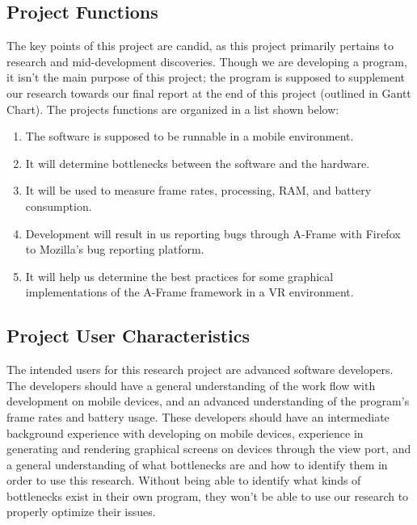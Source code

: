 \documentclass[letterpaper,10pt,titlepage,draftclsnofoot,onecolumn,compsoc,utf8,latin1]{IEEEtran}
\begin{document}
\subsection{Project Functions}
\begin{singlespace}
\noindent
The key points of this project are candid, as this project primarily pertains to research and mid-development discoveries. Though we are developing a program, it isn't the main purpose of this project; the program is supposed to supplement our research towards our final report at the end of this project (outlined in Gantt Chart). The projects functions are organized in a list shown below:\\
\begin{enumerate}[labelsep=2em,leftmargin=.5in]
    \item The software is supposed to be runnable in a mobile environment.
    \item It will determine bottlenecks between the software and the hardware.
    \item It will be used to measure frame rates, processing, RAM, and battery consumption.
    \item Development will result in us reporting bugs through A-Frame with Firefox to Mozilla's bug reporting platform.
    \item It will help us determine the best practices for some graphical implementations of the A-Frame framework in a VR environment.
\end{enumerate}
\end{singlespace}

\subsection{Project User Characteristics}
\begin{singlespace}
\noindent
The intended users for this research project are advanced software developers. The developers should have a general understanding of the work flow with development on mobile devices, and an advanced understanding of the program's frame rates and battery usage. These developers should have an intermediate background experience with developing on mobile devices, experience in generating and rendering graphical screens on devices through the view port, and a general understanding of what bottlenecks are and how to identify them in order to use this research. Without being able to identify what kinds of bottlenecks exist in their own program, they won't be able to use our research to properly optimize their issues.
\end{singlespace}
\end{document}
